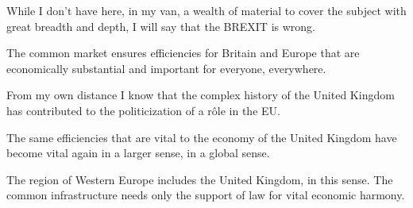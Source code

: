 

While I don't have here, in my van, a wealth of material to cover the
subject with great breadth and depth, I will say that the BREXIT is
wrong.

The common market ensures efficiencies for Britain and Europe that are
economically substantial and important for everyone, everywhere. 

From my own distance I know that the complex history of the United
Kingdom has contributed to the politicization of a r\^ole in the EU.

The same efficiencies that are vital to the economy of the United
Kingdom have become vital again in a larger sense, in a global sense.

The region of Western Europe includes the United Kingdom, in this
sense.  The common infrastructure needs only the support of law for
vital economic harmony.

\bye
